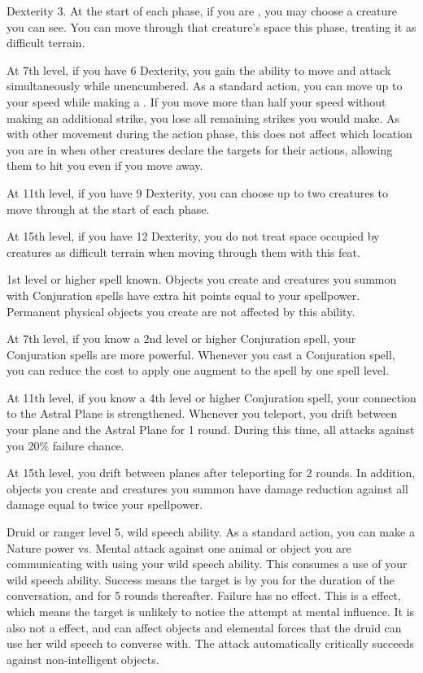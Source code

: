     \featpres Dexterity 3.
    \featben At the start of each phase, if you are , you may choose a creature you can see.
    You can move through that creature's space this phase, treating it as difficult terrain.

    At 7th level, if you have 6 Dexterity, you gain the ability to move and attack simultaneously while unencumbered.
    As a standard action, you can move up to your speed while making a .
    If you move more than half your speed without making an additional strike, you lose all remaining strikes you would make.
    As with other movement during the action phase, this does not affect which location you are in when other creatures declare the targets for their actions, allowing them to hit you even if you move away.

    At 11th level, if you have 9 Dexterity, you can choose up to two creatures to move through at the start of each phase.

    At 15th level, if you have 12 Dexterity, you do not treat space occupied by creatures as difficult terrain when moving through them with this feat.

    \featpres 1st level or higher  spell known.
    \featben Objects you create and creatures you summon with Conjuration spells have extra hit points equal to your spellpower.
    Permanent physical objects you create are not affected by this ability.

    At 7th level, if you know a 2nd level or higher Conjuration spell, your Conjuration spells are more powerful.
    Whenever you cast a Conjuration spell, you can reduce the cost to apply one augment to the spell by one spell level.

    At 11th level, if you know a 4th level or higher Conjuration spell, your connection to the Astral Plane is strengthened.
    Whenever you teleport, you drift between your plane and the Astral Plane for 1 round.
    During this time, all attacks against you 20\% failure chance.

    At 15th level, you drift between planes after teleporting for 2 rounds.
    In addition, objects you create and creatures you summon have damage reduction against all damage equal to twice your spellpower.

    \featpres Druid or ranger level 5, wild speech ability.
    \featben  As a standard action, you can make a Nature power vs. Mental attack against one animal or object you are communicating with using your wild speech ability.
    This consumes a use of your wild speech ability.
    Success means the target is \charmed by you for the duration of the conversation, and for 5 rounds thereafter.
    Failure has no effect.
    This is a  effect, which means the target is unlikely to notice the attempt at mental influence.
    It is also not a  effect, and can affect objects and elemental forces that the druid can use her wild speech to converse with.
    The attack automatically critically succeeds against non-intelligent objects.

